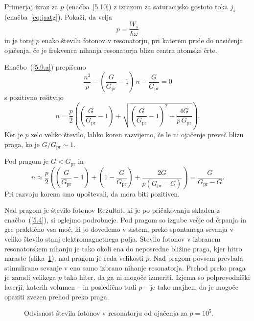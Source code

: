\begin{definition}
Primerjaj izraz za $p$ (enačba~\ref{5.10}) z izrazom za saturacijsko 
gostoto toka $j_s$ (enačba~\ref{eq:jsatg}). Pokaži, da velja
\begin{equation}
p = \frac{W_s}{\hbar \omega}
\end{equation}
in je torej $p$ enako številu fotonov v resonatorju, pri katerem pride 
do nasičenja ojačenja, če je frekvenca nihanja resonatorja blizu 
centra atomske črte. 
\end{definition}

Enačbo~(\ref{5.9.a}) prepišemo
\begin{equation}
\frac{n^2}{p}-(\frac{G}{G_\mathrm{pr}}-1)\,n-\frac{G}{G_\mathrm{pr}}=0
\label{5.11}
\end{equation}
s pozitivno rešitvijo 
\begin{equation}
n=\frac{p}{2}\left( \left(\frac{G}{G_\mathrm{pr}}-1\right)+\sqrt{\left(\frac{G}{G_\mathrm{pr}}
-1\right)^{2}+ \frac{4G}{p\,G_\mathrm{pr}}}\right).
\label{5.12}
\end{equation}
Ker je $p$ zelo veliko število, lahko koren razvijemo, če le ni ojačenje
preveč blizu praga, ko je $G/G_\mathrm{pr}\sim 1$. 

Pod pragom je $G<G_\mathrm{pr}$ in 
\begin{equation}
n\approx \frac{p}{2}\left( \left(\frac{G}{G_\mathrm{pr}}-1\right)+\left(1
-\frac{G}{G_\mathrm{pr}}\right)+\frac{2G}{p(G_\mathrm{pr}-G)}\right) =\frac{G}{G_\mathrm{pr}-G}.
\label{5.13}
\end{equation}
Pri razvoju korena smo upoštevali, da mora biti pozitiven. 

Nad pragom je
število fotonov 
Rezultat, ki je po pričakovanju skladen z enačbo~(\ref{5.4}), si oglejmo podrobneje. 
Pod pragom so izgube večje od črpanja in gre praktično vsa moč, ki jo dovedemo v sistem, 
preko spontanega sevanja v veliko število stanj elektromagnetnega polja. 
Število fotonov v izbranem resonatorskem nihanju je tako okoli 
ena do neposredne bližine praga, kjer hitro naraste (slika~\ref{fig:p}), nad pragom
je reda velikosti $p$. 
Nad pragom povsem prevlada stimulirano sevanje v eno samo izbrano nihanje resonatorja. 
Prehod preko praga je zaradi velikega $p$ tako hiter, da ga ni mogoče izmeriti.
Izjema so polprevodniški laserji, katerih 
volumen -- in posledično tudi $p$ -- 
je tako majhen, da je mogoče opaziti zvezen prehod preko praga.
\begin{figure}[h]
\centering
\def\svgwidth{50truemm} 

\caption{Odvisnost števila fotonov v resonatorju od ojačenja za $p=10^5$.}
\label{fig:p}
\end{figure}

